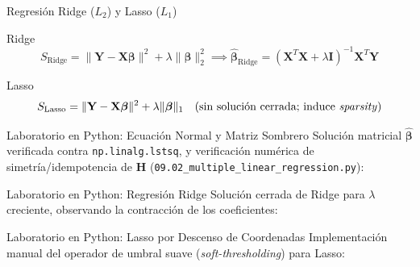 \documentclass[10pt, aspectratio=169]{beamer}
\begin{document}
\begin{frame}{Regresión Ridge ($L_2$) y Lasso ($L_1$)}
  \footnotesize
  \begin{block}{Ridge}
    $$S_{\text{Ridge}}=\|\mathbf{Y}-\mathbf{X}\boldsymbol\beta\|^2+\lambda\|\boldsymbol\beta\|_2^2 \implies \hat{\boldsymbol\beta}_{\text{Ridge}}=(\mathbf{X}^T\mathbf{X}+\lambda\mathbf{I})^{-1}\mathbf{X}^T\mathbf{Y}$$
  \end{block}
  \pause

  \vspace{0.1cm}
  \begin{alertblock}{Lasso}
    $$S_{\text{Lasso}}=\|\mathbf{Y}-\mathbf{X}\boldsymbol\beta\|^2+\lambda\|\boldsymbol\beta\|_1 \quad \text{(sin solución cerrada; induce \emph{sparsity})}$$
  \end{alertblock}
\end{frame}

\begin{frame}[fragile]{Laboratorio en Python: Ecuación Normal y Matriz Sombrero}
  \scriptsize
  Solución matricial $\hat{\boldsymbol\beta}$ verificada contra \texttt{np.linalg.lstsq}, y verificación numérica de simetría/idempotencia de $\mathbf{H}$ (\texttt{09.02\_multiple\_linear\_regression.py}):
  {
  }
\end{frame}

\begin{frame}[fragile]{Laboratorio en Python: Regresión Ridge}
  \scriptsize
  Solución cerrada de Ridge para $\lambda$ creciente, observando la contracción de los coeficientes:
  {
  }
\end{frame}

\begin{frame}[fragile]{Laboratorio en Python: Lasso por Descenso de Coordenadas}
  \scriptsize
  Implementación manual del operador de umbral suave (\emph{soft-thresholding}) para Lasso:
  {
  }
\end{frame}
\end{document}
